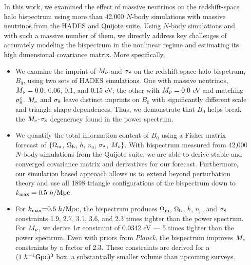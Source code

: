 In this work, we examined the effect of massive neutrinos on the redshift-space 
halo bispectrum using more than 42,000 $N$-body simulations with massive neutrinos
from the HADES and Quijote suite. Using $N$-body simulations and with such a massive 
number of them, we directly address key challenges of accurately modeling the 
bispectrum in the nonlinear regime and estimating its high dimensional covariance 
matrix. More specifically, 
\begin{itemize}
    \item We examine the imprint of $M_\nu$ and $\sigma_8$ on the redshift-space halo bispetrum, 
        $B_0$, using two sets of HADES simulations. One with massive neutrinos, $M_\nu = 0.0$, 0.06, 
        0.1, and 0.15 eV; the other with $M_\nu = 0.0$ eV and matching $\sigma_8^{c}$. 
        $M_\nu$ and $\sigma_8$ leave distinct imprints on $B_0$ with significantly different 
        scale and triangle shape dependences. Thus, we demonstrate that $B_0$ helps 
        break the $M_\nu$-$\sigma_8$ degeneracy found in the power spectrum. 
    \item We quantify the total information content of $B_0$ using a Fisher matrix forecast of 
        $\{\Omega_{\rm m}$, $\Omega_{\rm b}$, $h$, $n_s$, $\sigma_8$, $M_\nu\}$. With bispectrum measured from 42,000 
        $N$-body simulations from the Quijote suite, we are able to derive stable and converged 
        covariance matrix and derivatives for our forecast. Furthermore, our simulation 
        based approach allows us to extend beyond perturbation theory and use all 1898 
        triangle configurations of the bispectrum down to $k_{\rm max} = 0.5~h/{\rm Mpc}$.
    \item For $k_{\rm max}{=}0.5~h/{\rm Mpc}$, the bispectrum produces $\Omega_{\rm m}$, $\Omega_{\rm b}$, $h$, $n_s$, and 
        $\sigma_8$ constraints 1.9, 2.7, 3.1, 3.6, and 2.3 times tighter than the power spectrum. 
        For $M_\nu$, we derive 1$\sigma$ constraint of 0.0342 eV --- 5 times tighter than 
        the power spectrum. Even with priors from {\em Planck}, the bispectrum improves 
        $M_\nu$ constraints by a factor of 2.3. These constraints are derived for a 
        $(1~h^{-1}{\rm Gpc})^3$ box, a substantially smaller volume than upcoming surveys.
\end{itemize}

